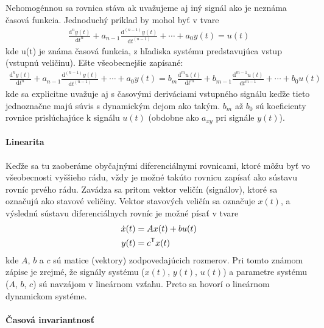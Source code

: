 \documentclass[a4paper, 10pt, ]{article}
\begin{document}
Nehomogénnou sa rovnica stáva ak uvažujeme aj iný signál ako je neznáma časová funkcia. Jednoduchý príklad by mohol byť v tvare
\begin{align} \label{vseobDifRov_nhj}
	\frac{\text{d}^n y(t)}{\text{d}t^n} + a_{n-1} \frac{\text{d}^{(n-1)} y(t)}{\text{d}t^{(n-1)}} + \cdots + a_0 y(t) = u(t)
\end{align}
kde u(t) je známa časová funkcia, z hľadiska systému predstavujúca vstup (vstupnú veličinu). Ešte všeobecnejšie zapísané:
\begin{align} \label{vseobDifRov_nh}
	\frac{\text{d}^n y(t)}{\text{d}t^n} + a_{n-1} \frac{\text{d}^{(n-1)} y(t)}{\text{d}t^{(n-1)}} + \cdots + a_0 y(t) = b_m \frac{\text{d}^m u(t)}{\text{d}t^m} + b_{m-1} \frac{\text{d}^{m-1} u(t)}{\text{d}t^{m-1}} + \cdots + b_0 u(t)
\end{align}
kde sa explicitne uvažuje aj s časovými deriváciami vstupného signálu keďže tieto jednoznačne majú súvis s dynamickým dejom ako takým. $b_{m}$ až $b_0$ sú koeficienty rovnice prislúchajúce k signálu $u(t)$ (obdobne ako $a_{xy}$ pri signále $y(t)$).


\paragraph{Linearita}

Keďže sa tu zaoberáme obyčajnými diferenciálnymi rovnicami, ktoré môžu byť vo všeobecnosti vyššieho rádu, vždy je možné takúto rovnicu zapísať ako sústavu rovníc prvého rádu. Zavádza sa pritom vektor veličín (signálov), ktoré sa označujú ako stavové veličiny. Vektor stavových veličín sa označuje $x(t)$, a výslednú sústavu diferenciálnych rovníc je možné písať v tvare
\begin{subequations} \label{LinearLTIsys}
\begin{align}
	\dot x(t) &= A x(t) + b u(t) \\
	y(t) &= c^{\mathsf{T}} x(t)
\end{align}
\end{subequations}
kde $A$, $b$ a $c$ sú matice (vektory) zodpovedajúcich rozmerov. Pri tomto známom zápise je zrejmé, že signály systému ($x(t)$, $y(t)$, $u(t)$) a parametre systému ($A$, $b$, $c$) sú navzájom v lineárnom vzťahu. Preto sa hovorí o lineárnom dynamickom systéme.


\paragraph{Časová invariantnosť}
\end{document}

